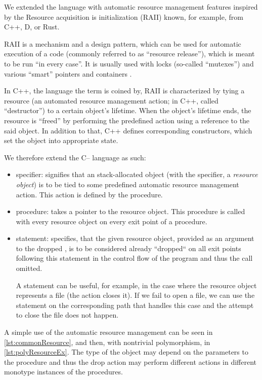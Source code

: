 We extended the \cmm language with automatic resource management features inspired by the Resource acquisition is initialization (RAII) known, for example, from C++, D, or Rust.

RAII is a mechanism and a design pattern, which can be used for automatic execution of a code (commonly referred to as ``resource release''), which is meant to be run ``in every case''. It is usually used with locks (so-called ``mutexes'') and various ``smart'' pointers and containers \cite{obiltschnigusing}.

In C++, the language the term is coined by, RAII is characterized by tying a resource (an automated resource management action; in C++, called ``destructor'') to a certain object's lifetime. When the object's lifetime ends, the resource is ``freed'' by performing the predefined action using a reference to the said object. In addition to that, C++ defines corresponding constructors, which set the object into appropriate state.

We therefore extend the C-- language as such:

\begin{itemize}
    \item {} specifier: signifies that an stack-allocated object (with the  specifier, a \emph{resource object}) is to be tied to some predefined automatic resource management action. This action is defined by the  procedure.

    \item {} procedure: takes a pointer to the resource object. This procedure is called with every resource object on every exit point of a procedure.

    \item {} statement: specifies, that the given resource object, provided as an argument to the dropped , is to be considered already ``dropped`` on all exit points following this statement in the control flow of the program and thus the  call omitted.

    A  statement can be useful, for example, in the case where the resource object represents a file (the  action closes it). If we fail to open a file, we can use the  statement on the corresponding path that handles this case and the attempt to close the file does not happen.
\end{itemize}

A simple use of the automatic resource management can be seen in \cref{lst:commonResource}, and then, with nontrivial polymorphism, in \cref{lst:polyResourceEx}. The type of the object may depend on the parameters to the procedure and thus the drop action may perform different actions in different monotype instances of the procedures.

